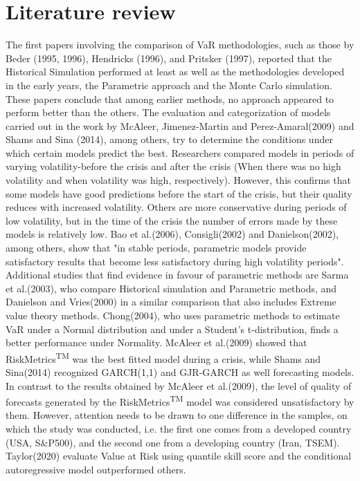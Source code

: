 \documentclass[a4paper,11pt,oneside]{book}
\begin{document}



\section{Literature review}

The first papers involving the comparison of VaR methodologies, such as those by Beder (1995, 1996), Hendricks (1996), and
Pritsker (1997), reported that the Historical Simulation performed at least as well as the methodologies developed in the early years, the Parametric approach and the Monte Carlo simulation. These papers conclude that among earlier methods, no approach appeared to perform better than the
others. The evaluation and categorization of models carried out in the work by McAleer, Jimenez-Martin and Perez-Amaral(2009) and Shams and Sina (2014), among others, try to determine the conditions under which certain models predict the best. Researchers compared models in periods of varying volatility-before the crisis and after the crisis (When there was no high volatility and when volatility was high, respectively). However, this confirms that some models have good predictions before the start of the crisis, but their quality reduces with increased volatility. Others are more conservative during periods of low volatility, but in the time of the crisis the number of errors made by these models is relatively low.
\newline\newline
Bao et al.(2006), Consigli(2002) and Danielson(2002), among
others, show that "in stable periods, parametric models provide satisfactory results
that become less satisfactory during high volatility periods".  Additional studies that find
evidence in favour of parametric methods are Sarma et al.(2003), who compare
Historical simulation and Parametric methods, and Danielson and Vries(2000) in a
similar comparison that also includes Extreme value theory methods. Chong(2004),
who uses parametric methods to estimate VaR under a Normal distribution and under a
Student’s t-distribution, finds a better performance under Normality. McAleer et al.(2009) showed that RiskMetrics\textsuperscript{TM} was
the best fitted model during a crisis, while Shams and Sina(2014) recognized GARCH(1,1) and GJR-GARCH as well
forecasting models. In contrast to the results obtained
by McAleer et al.(2009), the level of quality of forecasts
generated by the RiskMetrics\textsuperscript{TM} model was considered
unsatisfactory by them. However, attention needs to be
drawn to one difference in the samples, on which the
study was conducted, i.e. the first one comes from a
developed country (USA, S\&P500), and the second one
from a developing country (Iran, TSEM). Taylor(2020) evaluate Value at Risk using quantile skill score and the conditional autoregressive model outperformed others.
\newline\newline
\end{document}

